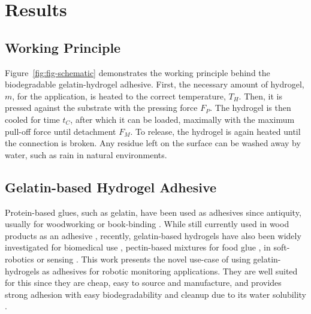 


\section{Results}

\subsection{Working Principle}

Figure~\ref{fig:fig-schematic} demonstrates the working principle behind the biodegradable gelatin-hydrogel adhesive. First, the necessary amount of hydrogel, $m$, for the application, is heated to the correct temperature, $T_H$. Then, it is pressed against the substrate with the pressing force $F_P$. The hydrogel is then cooled for time $t_C$, after which it can be loaded, maximally with the maximum pull-off force until detachment $F_M$. To release, the hydrogel is again heated until the connection is broken. Any residue left on the surface can be washed away by water, such as rain in natural environments.

\subsection{Gelatin-based Hydrogel Adhesive}

Protein-based glues, such as gelatin, have been used as adhesives since antiquity, usually for woodworking or book-binding \cite{Bye1990}. While still currently used in wood products as an adhesive \cite{Dorr2015, Liu2002}, recently, gelatin-based hydrogels have also been widely investigated for biomedical use \cite{Jaipan2017}, pectin-based mixtures for food glue \cite{Moll2022a}, in soft-robotics \cite{Baumgartner2020} or sensing \cite{Hardman2022, Heiden2022, Hardman2021}. This work presents the novel use-case of using gelatin-hydrogels as adhesives for robotic monitoring applications. They are well suited for this since they are cheap, easy to source and manufacture, and provides strong adhesion with easy biodegradability and cleanup due to its water solubility \cite{Hartmann2021}.

